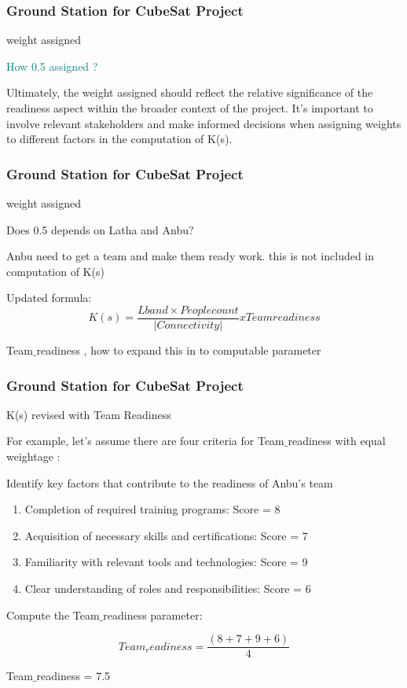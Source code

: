 \newpage
\begin{frame}
\frametitle{Ground Station for CubeSat Project }
\begin{block}{weight assigned }

\textcolor{teal}{
How 0.5 assigned ? }

Ultimately, the weight assigned should reflect the relative significance of the readiness aspect within the broader context of the project. It's important to involve relevant stakeholders and make informed decisions when assigning weights to different factors in the computation of K(s).

\end{block}
\end{frame}



\newpage
\begin{frame}
\frametitle{Ground Station for CubeSat Project }
\begin{block}{weight assigned }

Does 0.5 depends on Latha and Anbu?

Anbu need to get a team and make them ready work.  this is not included in computation of K(s)


Updated formula:
\[ 
K(s) = \frac{Lband \times Peoplecount}{|Connectivity|}    x Teamreadiness \] 

Team$\_$readiness , how to expand this in to computable parameter 

\end{block}
\end{frame}



\newpage
\begin{frame}
\frametitle{Ground Station for CubeSat Project }
\begin{block}{K(s) revised with Team Readiness}

For example, let's assume there are four criteria for Team$\_$readiness with equal weightage : 

Identify key factors that contribute to the readiness of Anbu's team

\begin{enumerate}
    \item  Completion of required training programs: Score = 8
    \item  Acquisition of necessary skills and certifications: Score = 7
    \item  Familiarity with relevant tools and technologies: Score = 9
    \item Clear understanding of roles and responsibilities: Score = 6

\end{enumerate}

Compute the Team$\_$readiness parameter:

\[ 
Team_readiness =\frac{(8 + 7 + 9 + 6)}{4}  \]

Team$\_$readiness =  7.5

\end{block}
\end{frame}


